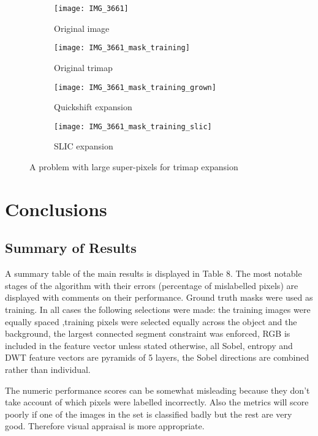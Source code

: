 \documentclass[12pt]{IIBproject}
\begin{document}
\begin{figure}[H]
\centering
\begin{subfigure}{.45\textwidth}
  \centering
  \texttt{[image: IMG\_3661]}
  \caption{Original image}
  \label{fig:sub2}
\end{subfigure}
\begin{subfigure}{.45\textwidth}
  \centering
  \texttt{[image: IMG\_3661\_mask\_training]}
  \caption{Original trimap}
  \label{fig:sub2}
\end{subfigure}
\begin{subfigure}{.45\textwidth}
  \centering
  \texttt{[image: IMG\_3661\_mask\_training\_grown]}
  \caption{Quickshift expansion}
  \label{fig:sub2}
\end{subfigure}
\begin{subfigure}{.45\textwidth}
  \centering
  \texttt{[image: IMG\_3661\_mask\_training\_slic]}
  \caption{SLIC expansion}
  \label{fig:sub2}
\end{subfigure}



\caption{A problem with large super-pixels for trimap expansion}
\label{fig:test}
\end{figure}








\section{Conclusions}
\subsection{Summary of Results}
A summary table of the main results is displayed in Table 8. The most notable stages of the algorithm with their errors (percentage of mislabelled pixels) are displayed with comments on their performance. Ground truth masks were used as training. In all cases the following selections were made: the training images were equally spaced ,training pixels were selected equally across the object and the background, the largest connected segment constraint was enforced, RGB is included in the feature vector unless stated otherwise, all Sobel, entropy and DWT feature vectors are pyramids of 5 layers, the Sobel directions are combined rather than individual.

The numeric performance scores can be somewhat misleading because they don't take account of which pixels were labelled incorrectly. Also the metrics will score poorly if one of the images in the set is classified badly but the rest are very good. Therefore visual appraisal is more appropriate.
\end{document}
